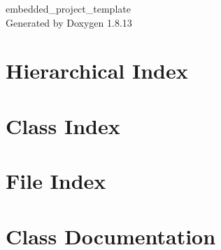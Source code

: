 \documentclass[twoside]{book}
\newcommand{\+}{\discretionary{\mbox{\scriptsize$\hookleftarrow$}}{}{}}
\newcommand{\clearemptydoublepage}{%
  \newpage{\pagestyle{empty}\cleardoublepage}%
}
\begin{document}
\hypersetup{pageanchor=false,
             bookmarksnumbered=true,
             pdfencoding=unicode
            }
\begin{titlepage}
\vspace*{7cm}
\begin{center}%
{\Large embedded\+\_\+project\+\_\+template }\\
\vspace*{1cm}
{\large Generated by Doxygen 1.8.13}\\
\end{center}
\end{titlepage}
\clearemptydoublepage
{}
\tableofcontents
\clearemptydoublepage
{}
\hypersetup{pageanchor=true}

\chapter{Hierarchical Index}

\chapter{Class Index}

\chapter{File Index}

\chapter{Class Documentation}




































\end{document}
